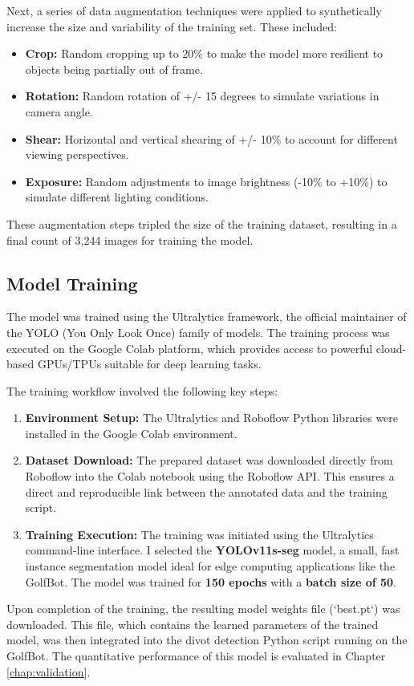 Next, a series of data augmentation techniques were applied to synthetically increase the size and variability of the training set. These included:
\begin{itemize}
    \item \textbf{Crop:} Random cropping up to 20\% to make the model more resilient to objects being partially out of frame.
    \item \textbf{Rotation:} Random rotation of +/- 15 degrees to simulate variations in camera angle.
    \item \textbf{Shear:} Horizontal and vertical shearing of +/- 10\% to account for different viewing perspectives.
    \item \textbf{Exposure:} Random adjustments to image brightness (-10\% to +10\%) to simulate different lighting conditions.
\end{itemize}
These augmentation steps tripled the size of the training dataset, resulting in a final count of 3,244 images for training the model.

\subsection{Model Training}
\label{ssec:cv_training}
The model was trained using the Ultralytics framework, the official maintainer of the YOLO (You Only Look Once) family of models. The training process was executed on the Google Colab platform, which provides access to powerful cloud-based GPUs/TPUs suitable for deep learning tasks.

The training workflow involved the following key steps:
\begin{enumerate}
    \item \textbf{Environment Setup:} The Ultralytics and Roboflow Python libraries were installed in the Google Colab environment.
    \item \textbf{Dataset Download:} The prepared dataset was downloaded directly from Roboflow into the Colab notebook using the Roboflow API. This ensures a direct and reproducible link between the annotated data and the training script.
    \item \textbf{Training Execution:} The training was initiated using the Ultralytics command-line interface. I selected the \textbf{YOLOv11s-seg} model, a small, fast instance segmentation model ideal for edge computing applications like the GolfBot. The model was trained for \textbf{150 epochs} with a \textbf{batch size of 50}.
\end{enumerate}
Upon completion of the training, the resulting model weights file (`best.pt`) was downloaded. This file, which contains the learned parameters of the trained model, was then integrated into the divot detection Python script running on the GolfBot. The quantitative performance of this model is evaluated in Chapter \ref{chap:validation}.

